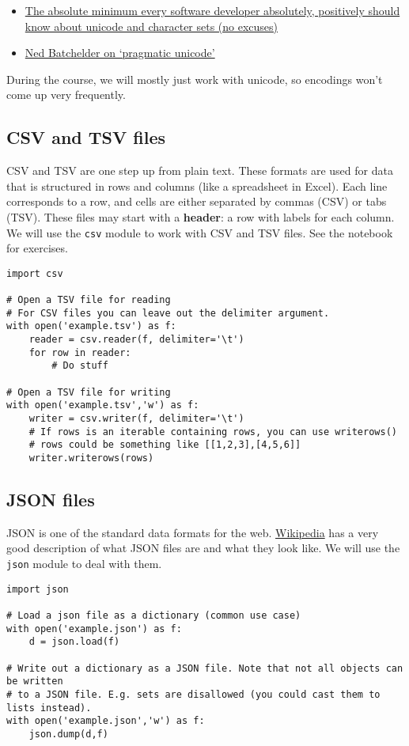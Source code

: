 \documentclass[12pt]{book}
\begin{document}
\begin{itemize}
\item \href{http://www.joelonsoftware.com/articles/Unicode.html}{The
  absolute minimum every software developer absolutely, positively
  should know about unicode and character sets (no excuses)}
\item \href{http://nedbatchelder.com/text/unipain.html}{Ned Batchelder on
  `pragmatic unicode'}
\end{itemize}

During the course, we will mostly just work with unicode, so encodings won't come up very frequently.

\subsection{CSV and TSV files}

CSV and TSV are one step up from plain text. These formats are used for data that is structured in rows and columns (like a spreadsheet in Excel). Each line corresponds to a row, and cells are either separated by commas (CSV) or tabs (TSV). These files may start with a \textbf{header}: a row with labels for each column. We will use the \texttt{csv} module to work with CSV and TSV files. See the notebook for exercises.

\begin{lstlisting}
import csv

# Open a TSV file for reading
# For CSV files you can leave out the delimiter argument.
with open('example.tsv') as f:
    reader = csv.reader(f, delimiter='\t')
    for row in reader:
        # Do stuff

# Open a TSV file for writing
with open('example.tsv','w') as f:
    writer = csv.writer(f, delimiter='\t')
    # If rows is an iterable containing rows, you can use writerows()
    # rows could be something like [[1,2,3],[4,5,6]]
    writer.writerows(rows)
\end{lstlisting}

\subsection{JSON files}

JSON is one of the standard data formats for the web. \href{(https://en.wikipedia.org/wiki/JSON}{Wikipedia} has a very good description of what JSON files are and what they look like. We will use the \texttt{json} module to deal with them.

\begin{lstlisting}
import json

# Load a json file as a dictionary (common use case)
with open('example.json') as f:
    d = json.load(f)

# Write out a dictionary as a JSON file. Note that not all objects can be written
# to a JSON file. E.g. sets are disallowed (you could cast them to lists instead).
with open('example.json','w') as f:
    json.dump(d,f)
\end{lstlisting}
\end{document}
